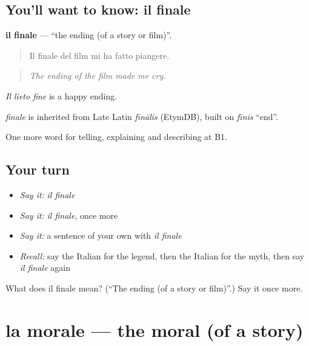 \subsection*{You'll want to know: il finale}
\textbf{il finale} — \textquotedblleft{}the ending (of a story or film)\textquotedblright{}.

\begin{quote}
Il finale del film mi ha fatto piangere.
\end{quote}

\begin{quote}
\emph{The ending of the film made me cry.}
\end{quote}

\emph{Il lieto fine} is a happy ending.

\begin{cousinweb}
\emph{finale} is inherited from Late Latin \emph{fīnālis} (EtymDB), built on \emph{fīnis} \textquotedblleft{}end\textquotedblright{}.
\end{cousinweb}

\begin{grammarlens}[title={What you've built}]
One more word for telling, explaining and describing at B1.
\end{grammarlens}

\subsection*{Your turn}
\begin{itemize}
\raggedright
  \item \emph{Say it:} \emph{il finale}
  \item \emph{Say it:} \emph{il finale}, once more
  \item \emph{Say it:} a sentence of your own with \emph{il finale}
  \item \emph{Recall:} say the Italian for the legend, then the Italian for the myth, then say \emph{il finale} again
\end{itemize}

\begin{tcolorbox}[breakable,colback=teal!4,colframe=teal!35!black,title={Before you move on}]
What does il finale mean? (\textquotedblleft{}The ending (of a story or film)\textquotedblright{}.) Say it once more.
\end{tcolorbox}
\section[la morale]{la morale — the moral (of a story)}

